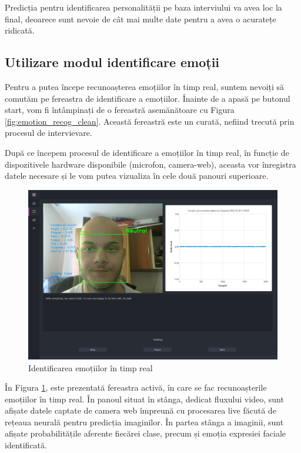 \documentclass[a4paper, 12pt]{report}
\begin{document}
	Predicția pentru identificarea personalității pe baza interviului va avea loc la final, deoarece sunt nevoie de cât mai multe date pentru a avea o acuratețe ridicată.
	
	\clearpage
	\subsection{Utilizare modul identificare emoții}
	Pentru a putea începe recunoașterea emoțiilor în timp real, suntem nevoiți să comutăm pe fereastra de identificare a emoțiilor. Înainte de a apasă pe butonul start, vom fi întâmpinați de o fereastră asemănătoare cu Figura \ref{fig:emotion_recog_clean}. Această fereastră este un curată, nefiind trecută prin procesul de intervievare. 

	După ce începem procesul de identificare a emoțiilor în timp real, în funcție de dispozitivele hardware disponibile (microfon, camera-web), aceasta vor înregistra datele necesare și le vom putea vizualiza în cele două panouri superioare.
	
	\begin{figure}[H]
		\begin{center}
			\includegraphics[scale=0.35]{images/emotion_recognition.png}
		\end{center}
		\caption{Identificarea emoțiilor în timp real}
		\label{fig:emotion_recog}
	\end{figure} 

	În Figura \ref{fig:emotion_recog}, este prezentată fereastra activă, în care se fac recunoașterile emoțiilor în timp real. În panoul situat în stânga, dedicat fluxului video, sunt afișate datele captate de camera web împreună cu procesarea live făcută de rețeaua neurală pentru predicția imaginilor. În partea stânga a imaginii, sunt afișate probabilitățile aferente fiecărei clase, precum și emoția expresiei faciale identificată. 
\end{document}
